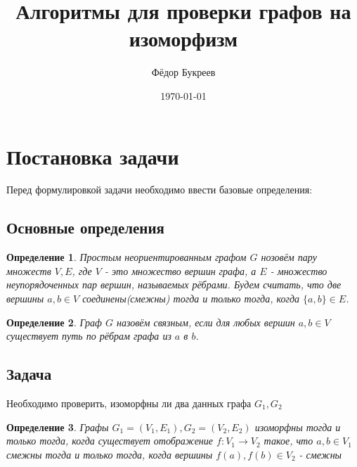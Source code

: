 \documentclass[fleqn]{article}
\title{Алгоритмы для проверки графов на изоморфизм}
\author{Фёдор Букреев}
\date{\today}
\newtheorem{definition}{Определение}
\begin{document}
\maketitle
\tableofcontents

\section{Постановка задачи}
Перед формулировкой задачи необходимо ввести базовые определения:
\subsection{Основные определения}
\begin{definition}
    Простым неориентированным графом $G$ нозовём пару множеств $V, E$, где $V$ - это множество вершин графа, а $E$ - множество неупорядоченных пар вершин, называемых рёбрами. Будем считать, что две вершины $a, b \in V$ соединены(смежны) тогда и только тогда, когда $\{a, b\} \in E$.
\end{definition}
\begin{definition}
    Граф $G$ назовём связным, если для любых вершин $a, b \in V$ существует путь по рёбрам графа из $a$ в $b$.
\end{definition}
\subsection{Задача}
Необходимо проверить, изоморфны ли два данных графа $G_1, G_2$
\begin{definition}
    Графы $G_1=(V_1, E_1), G_2=(V_2, E_2)$ изоморфны тогда и только тогда, когда существует отображение $f: V_1 \rightarrow V_2$ такое, что $a, b \in V_1$ смежны тогда и только тогда, когда вершины $f(a), f(b) \in V_2$ - смежны
\end{definition}






\end{document}
